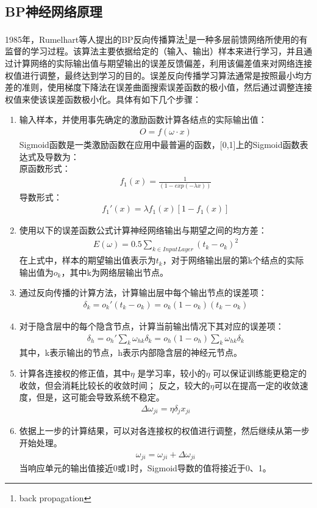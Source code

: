 \subsection{BP神经网络原理}
1985年，Rumelhart等人提出的BP反向传播算法\footnote{back propagation}是一种多层前馈网络所使用的有监督的学习过程。该算法主要依据给定的（输入、输出）样本来进行学习，并且通过计算网络的实际输出值与期望输出的误差反馈偏差，利用该偏差值来对网络连接权值进行调整，最终达到学习的目的。误差反向传播学习算法通常是按照最小均方差的准则，使用梯度下降法在误差曲面搜索误差函数的极小值，然后通过调整连接权值来使该误差函数极小化。具体有如下几个步骤：
\begin{enumerate}[noitemsep,topsep=0pt,parsep=0pt,partopsep=0pt]
	\item 输入样本，并使用事先确定的激励函数计算各结点的实际输出值：
	 	\begin{align}
	 		O = f(\omega \cdot x)
	 	\end{align}
	 	Sigmoid函数是一类激励函数在应用中最普遍的函数，[0,1]上的Sigmoid函数表达式及导数为：\\
	 	原函数形式：
	 	\begin{align}
	 		f_{1}(x) = \frac{1}{(1 - exp(-\lambda x))}
	 	\end{align}
	 	导数形式：
		\begin{align}
	 		f_{1}'(x) = \lambda f_{1}(x)[1-f_{1}(x)]
	 	\end{align}
	 \item 使用以下的误差函数公式计算神经网络输出与期望之间的均方差：
	 	\begin{align}
	 		E(\omega) = 0.5\sum_{k\in Input Layer}(t_{k} - o_{k})^{2}
	 	\end{align}
	 	在上式中，样本的期望输出值表示为$t_{k}$，对于网络输出层的第k个结点的实际输出值为$o_{k}$，其中k为网络层输出节点。
	 \item 通过反向传播的计算方法，计算输出层中每个输出节点的误差项：
	 	\begin{align}
	 		\delta_{k} = o_{k}'(t_{k} - o_{k}) = o_{k}(1 - o_{k})(t_{k} - o_{k})
	 	\end{align}
	 \item 对于隐含层中的每个隐含节点，计算当前输出情况下其对应的误差项：
	 	\begin{align}
	 		\delta_{h} = o_{h}'\sum_{k}\omega_{hk}\delta_{k} = o_{h}(1 - o_{h})\sum_{k}\omega_{hk}\delta_{k}
	 	\end{align}
	 	其中，k表示输出的节点，h表示内部隐含层的神经元节点。
	\item 计算各连接权的修正值，其中$\eta$ 是学习率，较小的$\eta$ 可以保证训练能更稳定的收敛，但会消耗比较长的收敛时间；
	反之，较大的$\eta$可以在提高一定的收敛速度，但是，这可能会导致系统不稳定。
	 	\begin{align}
	 		\Delta \omega_{ji} = \eta \delta_{j} x_{ji}
	 	\end{align}
	 \item 依据上一步的计算结果，可以对各连接权的权值进行调整，然后继续从第一步开始处理。
	 	\begin{align}
	 		\omega_{ji} = \omega_{ji} + \Delta\omega_{ji}
	 	\end{align}
	 	当响应单元的输出值接近0或1时，Sigmoid导数的值将接近于0、1。
\end{enumerate}


